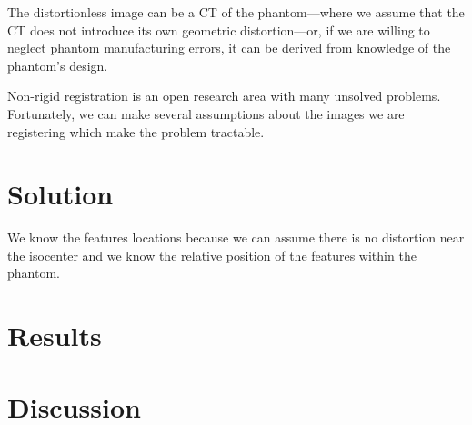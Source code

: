 \documentclass[12pt]{article}
\begin{document}
The distortionless image can be a CT of the phantom---where we assume that the CT does not introduce its own geometric distortion---or, if we are willing to neglect phantom manufacturing errors, it can be derived from knowledge of the phantom's design.

Non-rigid registration is an open research area with many unsolved problems.  Fortunately, we can make several assumptions about the images we are registering which make the problem tractable.

\section*{Solution}
  We know the features locations because we can assume there is no distortion near the isocenter and we know the relative position of the features within the phantom.

\section*{Results}

\section*{Discussion}



\end{document}
